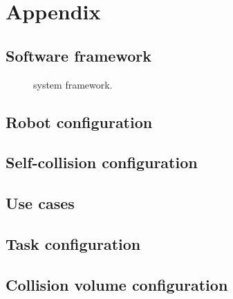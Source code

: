 \newpage
\onecolumn
\section{Appendix}

\subsection{Software framework}
\begin{figure*}[htbp]
    \centering
    \vspace{2cm}  %
    \vspace{2.5cm}
    \caption{\spark system framework.}
    \label{fig:system}
\end{figure*}


\subsection{Robot configuration}
\label{appendix: robot_config}

\clearpage
\subsection{Self-collision configuration}
\label{appendix: self_collision}


\subsection{Use cases}
\label{appendix:agent_task}

\subsection{Task configuration}
\label{appendix: task_config}

\clearpage

\subsection{Collision volume configuration}
\label{appendix: collision_config}


